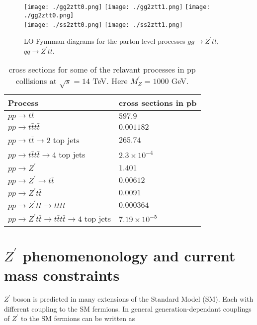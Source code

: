 \documentclass[12pt,a4paper]{article}		%
\begin{document}
	\begin{figure}[h] 	 		
		\begin{centering}	
			\texttt{[image: ./gg2ztt0.png]}				\texttt{[image: ./gg2ztt1.png]}
			\texttt{[image: ./gg2ztt0.png]} \\ 			
			\texttt{[image: ./ss2ztt0.png]} 
			\texttt{[image: ./ss2ztt1.png]}
			\caption{ LO Fynnman diagrams for the parton level processes $gg \to Z^\prime t \bar{t}$, $qq \to Z^\prime t \bar{t}$. }
			\label{fynnmann}
			\centering
		\end{centering}
	\end{figure}   



\begin{table}[h!]
	\caption{cross sections for some of the relavant processes in pp collisions at $\sqrt{s}= 14$ TeV. Here $M_Z^\prime = 1000$ GeV.	  }
	\centering
	\begin{tabular}{ |p{5cm}|p{5cm}| }
		\hline
		Process 	& cross sections in pb\\
		\hline
		$pp \to t \bar{t} $ & $597.9$\\
		\hline
		$pp \to t \bar{t} t \bar{t} $ & $0.001182 $ \\
		\hline
		$pp \to t \bar{t} \to 2 $ top jets & $265.74 $ \\
		\hline
		$pp \to t \bar{t} t \bar{t} \to 4 $ top jets& $ 2.3 \times 10^{-4} $ \\
		\hline
		$pp \to Z^\prime $ & $ 1.401  $ \\
		\hline
		$pp \to  Z^\prime \to t \bar{t} $ & $ 0.00612 $ \\
		\hline
		$pp  \to Z^\prime t \bar{t} $ & $ 0.0091 $ \\
		\hline
		$pp  \to Z^\prime t \bar{t} \to t \bar{t}t \bar{t}$ & $ 0.000364 $ \\
		\hline
		$pp  \to Z^\prime t \bar{t} \to t \bar{t} t \bar{t} \to 4$ top jets & $  7.19 \times 10^{-5}  $ \\
		\hline		
	\end{tabular}
	\label{csxtable}
\end{table}


\newpage 

\section{ $Z^\prime$ phenomenonology and current mass constraints }


 $Z^\prime$ boson is predicted in many extensions of the Standard Model (SM). Each with different coupling to the SM fermions. In general generation-dependant couplings of $Z^\prime$ to the SM fermions can be written as
 
\end{document}
